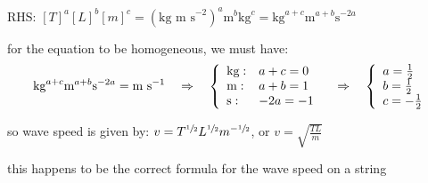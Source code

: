 \begin{soln} RHS: $[T]^a [L]^b [m]^c = (\text{kg m s}^{-2})^a \text{m}^b \text{kg}^c = \text{kg}^{a+c} \text{m}^{a+b} \text{s}^{-2a}$

for the equation to be homogeneous, we must have:
\begin{equation*}
	\text{kg}^{a+c} \text{m}^{a+b} \text{s}^{-2a} = \text{m s}^{-1} \quad \Rightarrow \quad
	\left\{ \begin{array}{ll}
	\text{kg}: & a+c=0 \\
	\text{m}: & a+b=1 \\
	\text{s}: & -2a=-1 \\
	\end{array}\right.
	\quad \Rightarrow \quad \left\{ \begin{array}{l}
	a=\tfrac{1}{2} \\
	b=\tfrac{1}{2} \\
	c=-\tfrac{1}{2} \\
	\end{array}\right.
\end{equation*}

so wave speed is given by: $v = T^{\sfrac{1}{2}} L^{\sfrac{1}{2}} m^{-\sfrac{1}{2}}$, or $v=\sqrt{\frac{TL}{m}}$

this happens to be the correct formula for the wave speed on a string \end{soln}


%	
%	
%	
%	
%	
%	
%	
%	
	



